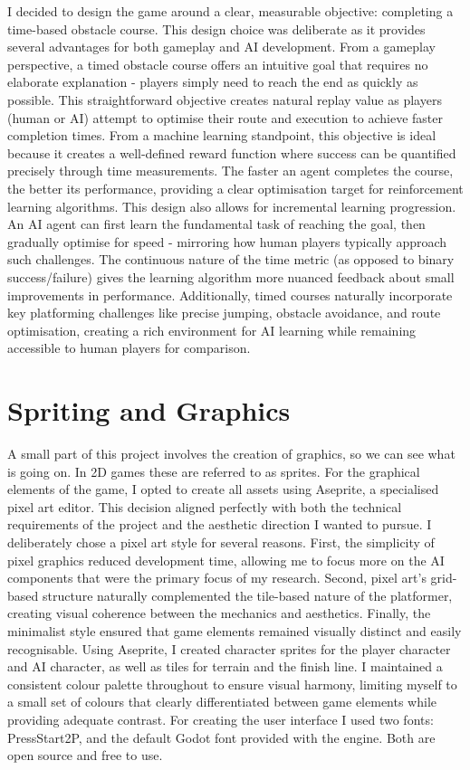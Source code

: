I decided to design the game around a clear, measurable objective: completing a time-based obstacle course. This design choice was deliberate as it provides several advantages for both gameplay and AI development.
From a gameplay perspective, a timed obstacle course offers an intuitive goal that requires no elaborate explanation - players simply need to reach the end as quickly as possible. 
This straightforward objective creates natural replay value as players (human or AI) attempt to optimise their route and execution to achieve faster completion times.
From a machine learning standpoint, this objective is ideal because it creates a well-defined reward function where success can be quantified precisely through time measurements. 
The faster an agent completes the course, the better its performance, providing a clear optimisation target for reinforcement learning algorithms.
This design also allows for incremental learning progression. An AI agent can first learn the fundamental task of reaching the goal, then gradually optimise for speed - mirroring how human players typically approach such challenges. 
The continuous nature of the time metric (as opposed to binary success/failure) gives the learning algorithm more nuanced feedback about small improvements in performance.
Additionally, timed courses naturally incorporate key platforming challenges like precise jumping, obstacle avoidance, and route optimisation, creating a rich environment for AI learning while remaining accessible to human players for comparison.

\section{Spriting and Graphics}
A small part of this project involves the creation of graphics, so we can see what is going on. In 2D games these are referred to as sprites.
For the graphical elements of the game, I opted to create all assets using Aseprite, a specialised pixel art editor. This decision aligned perfectly with both the technical requirements of the project and the aesthetic direction I wanted to pursue.
I deliberately chose a pixel art style for several reasons. 
First, the simplicity of pixel graphics reduced development time, allowing me to focus more on the AI components that were the primary focus of my research. 
Second, pixel art's grid-based structure naturally complemented the tile-based nature of the platformer, creating visual coherence between the mechanics and aesthetics. 
Finally, the minimalist style ensured that game elements remained visually distinct and easily recognisable.
Using Aseprite, I created character sprites for the player character and AI character, as well as tiles for terrain and the finish line.
I maintained a consistent colour palette throughout to ensure visual harmony, limiting myself to a small set of colours that clearly differentiated between game elements while providing adequate contrast.
For creating the user interface I used two fonts: PressStart2P, and the default Godot font provided with the engine. Both are open source and free to use.